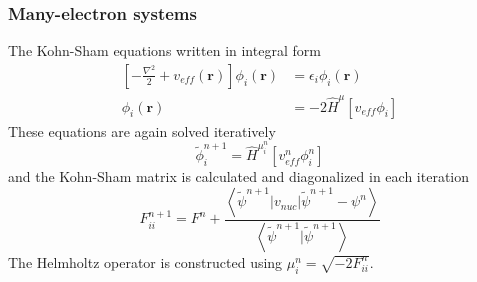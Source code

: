 \documentclass[mathserif]{beamer}
\begin{document}
\begin{frame}
\end{frame}

\begin{frame}
    \frametitle{Many-electron systems}
    The Kohn-Sham equations written in integral form
    \begin{align}
	\left[-\frac{\nabla^2}{2} + v_{eff}(\boldsymbol{r})\right]\phi_i(\boldsymbol{r}) &=
	\epsilon_i\phi_i(\boldsymbol{r})\\
	\phi_i(\boldsymbol{r}) &=
	-2\hat{H}^\mu\left[v_{eff}\phi_i\right] 
    \end{align}
    These equations are again solved iteratively
    \begin{equation}
	\tilde{\phi}_i^{n+1} = \hat{H}^{\mu_i^n}\left[v_{eff}^n\phi_i^n\right]
    \end{equation}
    and the Kohn-Sham matrix is calculated and diagonalized in each iteration
    \begin{equation}
	F_{ii}^{n+1} = F^n + 
	    \frac{\left<\tilde{\psi}^{n+1}|v_{nuc}|\tilde{\psi}^{n+1} - \psi^n\right>}
	    {\left<\tilde{\psi}^{n+1}|\tilde{\psi}^{n+1}\right>}
    \end{equation}
    The Helmholtz operator is constructed using $\mu_i^n = \sqrt{-2F_{ii}^n}$.
\end{frame}
\end{document}
